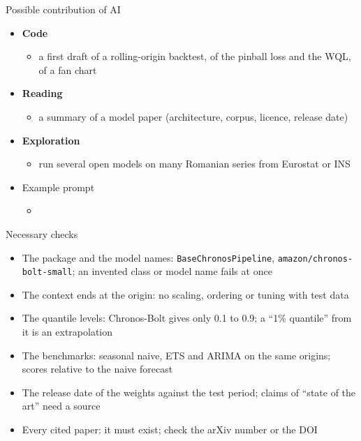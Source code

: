 \begin{frame}{Possible contribution of AI}
\itemsize{\small}
\begin{itemize}
    \item \textbf{Code}
    \begin{itemize}
        \item a first draft of a rolling-origin backtest, of the pinball loss and the WQL, of a fan chart
    \end{itemize}
    \item \textbf{Reading}
    \begin{itemize}
        \item a summary of a model paper (architecture, corpus, licence, release date)
    \end{itemize}
    \item \textbf{Exploration}
    \begin{itemize}
        \item run several open models on many Romanian series from Eurostat or INS
    \end{itemize}
    \item Example prompt
    \begin{itemize}
        \item {}
    \end{itemize}
\end{itemize}
\end{frame}

\begin{frame}{Necessary checks}
\itemsize{\small}
\begin{itemize}
    \item The package and the model names: \texttt{BaseChronosPipeline}, \texttt{amazon/chronos-bolt-small}; an invented class or model name fails at once
    \item The context ends at the origin: no scaling, ordering or tuning with test data
    \item The quantile levels: Chronos-Bolt gives only 0.1 to 0.9; a ``1\% quantile'' from it is an extrapolation
    \item The benchmarks: seasonal naive, ETS and ARIMA on the same origins; scores relative to the naive forecast
    \item The release date of the weights against the test period; claims of ``state of the art'' need a source
    \item Every cited paper: it must exist; check the arXiv number or the DOI
\end{itemize}
\end{frame}


